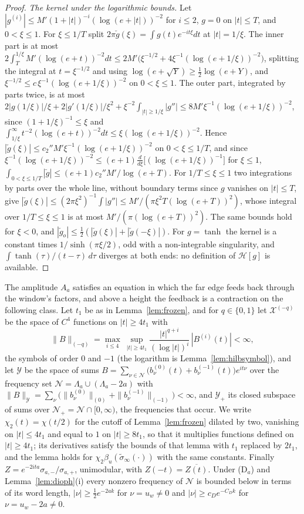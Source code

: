 \documentclass[11pt]{article}
\theoremstyle{definition}
\theoremstyle{remark}
\begin{document}
\begin{proof}
\emph{The kernel under the logarithmic bounds.} Let $|g^{(i)}|\le M'(1+|t|)^{-i}(\log(e+|t|))^{-2}$ for $i\le2$, $g=0$ on $|t|\le T$, and $0<\xi\le1$. For $\xi\le1/T$ split $2\pi\check g(\xi)=\int g(t)e^{-it\xi}dt$ at $|t|=1/\xi$. The inner part is at most $2\int_T^{1/\xi}M'(\log(e+t))^{-2}dt\le2M'\big(\xi^{-1/2}+4\xi^{-1}(\log(e+1/\xi))^{-2}\big)$, splitting the integral at $t=\xi^{-1/2}$ and using $\log(e+\sqrt Y)\ge\tfrac12\log(e+Y)$, and $\xi^{-1/2}\le c\,\xi^{-1}(\log(e+1/\xi))^{-2}$ on $0<\xi\le1$. The outer part, integrated by parts twice, is at most $2|g(1/\xi)|/\xi+2|g'(1/\xi)|/\xi^2+\xi^{-2}\int_{|t|\ge1/\xi}|g''|\le8M'\xi^{-1}(\log(e+1/\xi))^{-2}$, since $(1+1/\xi)^{-1}\le\xi$ and $\int_{1/\xi}^\infty t^{-2}(\log(e+t))^{-2}dt\le\xi(\log(e+1/\xi))^{-2}$. Hence $|\check g(\xi)|\le c_2''M'\xi^{-1}(\log(e+1/\xi))^{-2}$ on $0<\xi\le1/T$, and since $\xi^{-1}(\log(e+1/\xi))^{-2}\le(e+1)\frac{d}{d\xi}\big[(\log(e+1/\xi))^{-1}\big]$ for $\xi\le1$, $\int_{0<\xi\le1/T}|\check g|\le(e+1)c_2''M'/\log(e+T)$. For $1/T\le\xi\le1$ two integrations by parts over the whole line, without boundary terms since $g$ vanishes on $|t|\le T$, give $|\check g(\xi)|\le(2\pi\xi^2)^{-1}\int|g''|\le M'/(\pi\xi^2T(\log(e+T))^2)$, whose integral over $1/T\le\xi\le1$ is at most $M'/(\pi(\log(e+T))^2)$. The same bounds hold for $\xi<0$, and $|\check g_o|\le\tfrac12(|\check g(\xi)|+|\check g(-\xi)|)$. For $g=\tanh$ the kernel is a constant times $1/\sinh(\pi\xi/2)$, odd with a non-integrable singularity, and $\int\tanh(\tau)/(t-\tau)\,d\tau$ diverges at both ends: no definition of $\mathcal H[g]$ is available.
\end{proof}

The amplitude $A_a$ satisfies an equation in which the far edge feeds back through the window's factors, and above a height the feedback is a contraction on the following class. Let $t_1$ be as in Lemma~\ref{lem:frozen}, and for $q\in\{0,1\}$ let $\mathcal X^{(-q)}$ be the space of $C^4$ functions on $|t|\ge4t_1$ with
\[
\|B\|_{(-q)}=\max_{i\le4}\ \sup_{|t|\ge4t_1}\frac{|t|^{q+i}}{(\log|t|)^i}\,|B^{(i)}(t)|<\infty ,
\]
the symbols of order $0$ and $-1$ (the logarithm is Lemma~\ref{lem:hilbsymbol}), and let $\mathcal Y$ be the space of sums $B=\sum_{\nu\in\mathcal N}\big(b_\nu^{(0)}(t)+b_\nu^{(-1)}(t)\big)e^{it\nu}$ over the frequency set $\mathcal N=\Lambda_a\cup(\Lambda_a-2a)$ with $\|B\|_{\mathcal Y}=\sum_\nu\big(\|b^{(0)}_\nu\|_{(0)}+\|b^{(-1)}_\nu\|_{(-1)}\big)<\infty$, and $\mathcal Y_+$ its closed subspace of sums over $\mathcal N_+=\mathcal N\cap[0,\infty)$, the frequencies that occur. We write $\chi_2(t)=\chi(t/2)$ for the cutoff of Lemma~\ref{lem:frozen} dilated by two, vanishing on $|t|\le4t_1$ and equal to $1$ on $|t|\ge8t_1$, so that it multiplies functions defined on $|t|\ge4t_1$; its derivatives satisfy the bounds of that lemma with $t_1$ replaced by $2t_1$, and the lemma holds for $\chi_2\beta_u(\tilde\sigma_\infty(\cdot))$ with the same constants. Finally $Z=e^{-2ita}\sigma_{a,-}/\sigma_{a,+}$, unimodular, with $Z(-t)=\overline{Z(t)}$. Under (D$_a$) and Lemma~\ref{lem:dioph}(i) every nonzero frequency of $\mathcal N$ is bounded below in terms of its word length, $|\nu|\ge\tfrac12e^{-2ak}$ for $\nu=u_w\ne0$ and $|\nu|\ge c_De^{-C_Dk}$ for $\nu=u_w-2a\ne0$.
\end{document}
